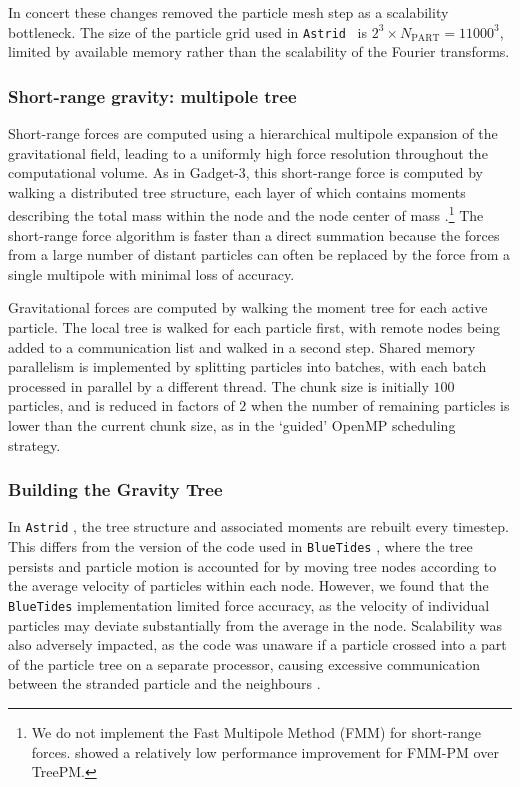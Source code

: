\documentclass[fleqn,usenatbib]{mnras}
\def\astrid{\texttt{Astrid} }
\def\bluetides{\texttt{BlueTides} }
\begin{document}
In concert these changes removed the particle mesh step as a scalability bottleneck. The size of the particle grid used in \astrid~is $2^3\times N_\mathrm{PART} = 11000^3$, limited by available memory rather than the scalability of the Fourier transforms. 

\subsubsection{Short-range gravity: multipole tree}

Short-range forces are computed using a hierarchical multipole expansion of the gravitational field, leading to a uniformly high force resolution throughout the computational volume. As in Gadget-3, this short-range force is computed by walking a distributed tree structure, each layer of which contains moments describing the total mass within the node and the node center of mass \citep{1986Natur.324..446B}.\footnote{We do not implement the Fast Multipole Method (FMM) for short-range forces. \cite{2020arXiv201003567S} showed a relatively low performance improvement for FMM-PM over TreePM.} The short-range force algorithm is faster than a direct summation because the forces from a large number of distant particles can often be replaced by the force from a single multipole with minimal loss of accuracy. 

Gravitational forces are computed by walking the moment tree for each active particle. The local tree is walked for each particle first, with remote nodes being added to a communication list and walked in a second step. Shared memory parallelism is implemented by splitting particles into batches, with each batch processed in parallel by a different thread. The chunk size is initially $100$ particles, and is reduced in factors of $2$ when the number of remaining particles is lower than the current chunk size, as in the `guided' OpenMP scheduling strategy.

\subsubsection{Building the Gravity Tree}

In \astrid, the tree structure and associated moments are rebuilt every timestep. This differs from the version of the code used in \bluetides, where the tree persists and particle motion is accounted for by moving tree nodes according to the average velocity of particles within each node. However, we found that the \bluetides implementation limited force accuracy, as the velocity of individual particles may deviate substantially from the average in the node. Scalability was also adversely impacted, as the code was unaware if a particle crossed into a part of the particle tree on a separate processor, causing excessive communication between the stranded particle and the neighbours \citep{Bird:2018}. 
\end{document}
